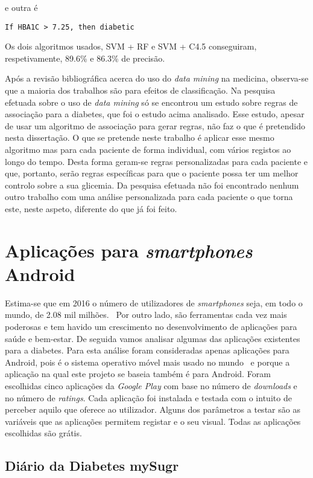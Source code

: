 e outra é

\begin{lstlisting}
If HBA1C > 7.25, then diabetic
\end{lstlisting}
Os dois algoritmos usados, SVM + RF e SVM + C4.5 conseguiram, respetivamente, 89.6\% e 86.3\% de precisão.

Após a revisão bibliográfica acerca do uso do \textit{data mining} na medicina, observa-se que a maioria dos trabalhos são para efeitos de classificação. Na pesquisa efetuada sobre o uso de \textit{data mining} só se encontrou um estudo sobre regras de associação para a diabetes, que foi o estudo acima analisado. Esse estudo, apesar de usar um algoritmo de associação para gerar regras, não faz o que é pretendido nesta dissertação. 
O que se pretende neste trabalho é aplicar esse mesmo algoritmo mas para cada paciente de forma individual, com vários registos ao longo do tempo. Desta forma geram-se regras personalizadas para cada paciente e que, portanto, serão regras específicas para que o paciente possa ter um melhor controlo sobre a sua glicemia. Da pesquisa efetuada não foi encontrado nenhum outro trabalho com uma análise personalizada para cada paciente o que torna este, neste aspeto, diferente do que já foi feito.


\section{Aplicações para \textit{smartphones} Android}

Estima-se que em 2016 o número de utilizadores de \textit{smartphones} seja, em todo o mundo, de 2.08 mil milhões.~\cite{users}
Por outro lado, são ferramentas cada vez mais poderosas e tem havido um crescimento no desenvolvimento de aplicações para saúde e bem-estar. De seguida vamos analisar algumas das aplicações existentes para a diabetes. Para esta análise foram consideradas apenas aplicações para Android, pois é o sistema operativo móvel mais usado no mundo~\cite{mercadomovel} e porque a aplicação na qual este projeto se baseia também é para Android. Foram escolhidas cinco aplicações da \textit{Google Play} com base no número de \textit{downloads} e no número de \textit{ratings}. Cada aplicação foi instalada e testada com o intuito de perceber aquilo que oferece ao utilizador. Alguns dos parâmetros a testar são as variáveis que as aplicações permitem registar e o seu visual. Todas as aplicações escolhidas são grátis.

\subsection{Diário da Diabetes mySugr}

